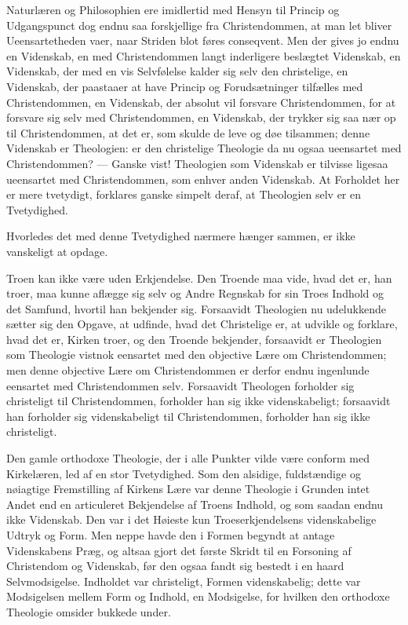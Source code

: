 \documentclass[12pt,a4paper]{book}
\newcommand{\opage}[1]{\marginnote{\footnotesize\textit{[#1]}}}
\begin{document}
Naturlæren og Philosophien ere imidlertid med Hensyn til Princip og
Udgangspunct dog endnu saa forskjellige fra Christendommen, at man let
bliver Ueensartetheden vaer, naar Striden blot føres conseqvent. Men der
gives jo endnu en Videnskab, en med Christendommen langt inderligere
beslægtet Videnskab, en Videnskab, der med en vis Selvfølelse kalder sig
selv den christelige, en Videnskab, der paastaaer at have Princip og
Forudsætninger tilfælles med Christendommen, en Videnskab, der absolut
vil forsvare Christendommen, for at forsvare sig selv med Christendommen,
en Videnskab, der trykker sig saa nær op til Christendommen, at det er,
som skulde de leve og døe tilsammen;
\opage{9} denne Videnskab er Theologien: er den christelige Theologie da nu ogsaa
ueensartet med Christendommen? --- Ganske vist! Theologien som
Videnskab er tilvisse ligesaa ueensartet med Christendommen, som enhver
anden Videnskab. At Forholdet her er mere tvetydigt, forklares ganske
simpelt deraf, at Theologien selv er en Tvetydighed.

Hvorledes det med denne Tvetydighed nærmere hænger sammen, er ikke
vanskeligt at opdage.

Troen kan ikke være uden Erkjendelse. Den Troende maa vide, hvad det er,
han troer, maa kunne aflægge sig selv og Andre Regnskab for sin Troes
Indhold og det Samfund, hvortil han bekjender sig. Forsaavidt Theologien
nu udelukkende sætter sig den Opgave, at udfinde, hvad det Christelige
er, at udvikle og forklare, hvad det er, Kirken troer, og den Troende
bekjender, forsaavidt er Theologien som Theologie vistnok eensartet med
den objective Lære om Christendommen; men denne objective Lære om
Christendommen er derfor endnu ingenlunde eensartet med Christendommen
selv. Forsaavidt Theologen forholder sig christeligt til Christendommen,
forholder han sig ikke videnskabeligt; forsaavidt han forholder sig
videnskabeligt til Christendommen, forholder han sig ikke christeligt.

Den gamle orthodoxe Theologie, der i alle Punkter vilde være conform med
Kirkelæren, led af en stor Tvetydighed. Som den alsidige, fuldstændige og
nøiagtige Fremstilling af Kirkens Lære var denne Theologie i Grunden
intet Andet end en articuleret Bekjendelse af Troens Indhold, og som
saadan endnu ikke Videnskab. Den var i det Høieste kun
Troeserkjendelsens videnskabelige Udtryk og Form. Men neppe havde den i
Formen begyndt at antage Videnskabens Præg, og altsaa gjort det første
Skridt til en Forsoning af Christendom og Videnskab, før den ogsaa fandt
sig bestedt i en haard Selvmodsigelse. Indholdet var christeligt, Formen
videnskabelig; dette var Modsigelsen mellem
\opage{10} Form og Indhold, en Modsigelse, for hvilken den orthodoxe Theologie
omsider bukkede under.
\end{document}

